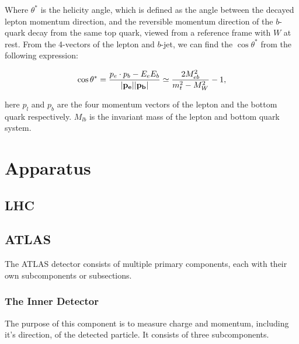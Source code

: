 \documentclass[11pt,a4paper]{article}
\begin{document}
Where $\theta^*$ is the helicity angle, which is defined as the angle between the decayed lepton momentum direction, and the reversible momentum direction of the $b$-quark decay from the same top quark, viewed from a reference frame with $W$ at rest. From the 4-vectors of the lepton and $b$-jet, we can find the $\cos \theta^*$ from the following expression:

\begin{equation}
\cos \theta^* = \frac{p_e \cdot p_b - E_e E_b}{\abs{\vb{p_e}} \abs{\vb{p_b}}} \simeq \frac{2 M_{eb}^2}{m_t^2 - M_W^2} - 1,
\end{equation}

here $p_l$ and $p_b$ are the four momentum vectors of the lepton and the bottom quark respectively. $M_{lb}$ is the invariant mass of the lepton and bottom quark system.

\section{Apparatus}

\subsection{LHC}

\subsection{ATLAS}


The ATLAS detector consists of multiple primary components, each with their own subcomponents or subsections.

\subsubsection{The Inner Detector}
The purpose of this component is to measure charge and momentum, including it's
direction, of the detected particle. It consists of three subcomponents.
\end{document}
